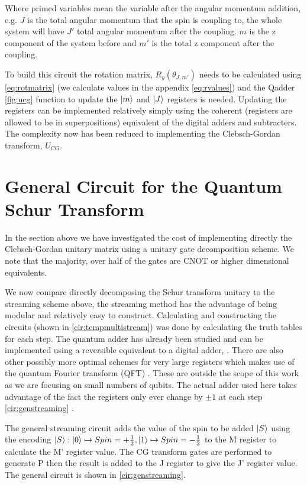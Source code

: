 \documentclass[12pt]{article}
\begin{document}
Where primed variables mean the variable after the angular momentum addition, e.g. $J$ is the total angular momentum that the spin is coupling to, the whole system will have $J'$ total angular momentum after the coupling. $m$ is the z component of the system before and $m'$ is the total z component after the coupling.

To build this circuit the rotation matrix, $R_y(\theta_{J,m'})$ needs to be calculated using \autoref{eq:rotmatrix} (we calculate values in the appendix \autoref{eq:rvalues}) and the Qadder \autoref{fig:ucg} function to update the $\left\vert{m}\right\rangle$ and $\left\vert{J}\right\rangle$ registers is needed. Updating the registers can be implemented relatively simply using the coherent (registers are allowed to be in superpositions) equivalent of the digital adders and subtracters. The complexity now has been reduced to implementing the Clebsch-Gordan transform, $U_{CG}$.

\section{General Circuit for the Quantum Schur Transform}

In the section above we have investigated the cost of implementing directly the Clebsch-Gordan unitary matrix using a unitary gate decomposition scheme. We note that the majority, over half of the gates are CNOT or higher dimensional equivalents.

We now compare directly decomposing the Schur transform unitary to the streaming scheme above, the streaming method has the advantage of being modular and relatively easy to construct. Calculating and constructing the circuits (shown in \autoref{cir:tempmultistream}) was done by calculating the truth tables for each step. The quantum adder has already been studied and can be implemented using a reversible equivalent to a digital adder, \cite{draper2004logarithmic}. There are also other possibly more optimal schemes for very large registers which makes use of the quantum Fourier transform (QFT) \cite{draper2000addition}. These are outside the scope of this work as we are focusing on small numbers of qubits. The actual adder used here takes advantage of the fact the registers only ever change by $\pm1$ at each step \autoref{cir:genstreaming} . 

The general streaming circuit adds the value of the spin to be added $\left\vert{S}\right\rangle$ using the encoding $\left\vert{S}\right\rangle : \left\vert{0}\right\rangle \mapsto Spin = +\frac{1}{2}, \left\vert{1}\right\rangle \mapsto Spin = -\frac{1}{2}$ to the M register to calculate the M' register value. The CG transform gates are performed to generate P then the result is added to the J register to give the J' register value. The general circuit is shown in \autoref{cir:genstreaming}.
\end{document}
